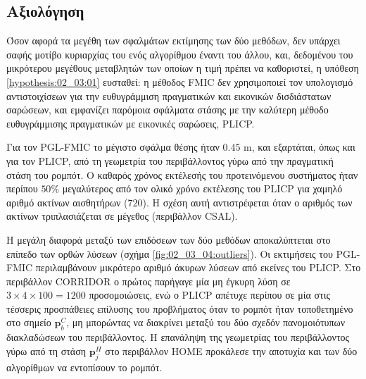 \subsection{Αξιολόγηση}
\label{subsection:02_03_04:03}

Όσον αφορά τα μεγέθη των σφαλμάτων εκτίμησης των δύο μεθόδων, δεν υπάρχει σαφής
μοτίβο κυριαρχίας του ενός αλγορίθμου έναντι του άλλου, και, δεδομένου του
μικρότερου μεγέθους μεταβλητών των οποίων η τιμή πρέπει να καθοριστεί, η
υπόθεση \ref{hypothesis:02_03:01} ευσταθεί: η μέθοδος FMIC δεν χρησιμοποιεί
τον υπολογισμό αντιστοιχίσεων για την ευθυγράμμιση πραγματικών και εικονικών
δισδιάστατων σαρώσεων, και εμφανίζει παρόμοια σφάλματα στάσης με την καλύτερη
μέθοδο ευθυγράμμισης πραγματικών με εικονικές σαρώσεις, PLICP.

Για τον PGL-FMIC το μέγιστο σφάλμα θέσης ήταν $0.45$ m, και εξαρτάται, όπως και
για τον PLICP, από τη γεωμετρία του περιβάλλοντος γύρω από την πραγματική στάση
του ρομπότ.  Ο καθαρός χρόνος εκτέλεσής του προτεινόμενου συστήματος ήταν
περίπου $50\%$ μεγαλύτερος από τον ολικό χρόνο εκτέλεσης του PLICP για χαμηλό
αριθμό ακτίνων αισθητήρων ($720$). H σχέση αυτή αντιστρέφεται όταν ο αριθμός
των ακτίνων τριπλασιάζεται σε μέγεθος (περιβάλλον CSAL).

Η μεγάλη διαφορά μεταξύ των επιδόσεων των δύο μεθόδων αποκαλύπτεται στο επίπεδο
των ορθών λύσεων (σχήμα \ref{fig:02_03_04:outliers}). Οι εκτιμήσεις του
PGL-FMIC περιλαμβάνουν μικρότερο αριθμό άκυρων λύσεων από εκείνες του PLICP.
Στο περιβάλλον CORRIDOR ο πρώτος παρήγαγε μία μη έγκυρη λύση σε
$3\times4\times100 = 1200$  προσομοιώσεις, ενώ ο PLICP απέτυχε περίπου σε μία
στις τέσσερις προσπάθειες επίλυσης του προβλήματος όταν το ρομπότ ήταν
τοποθετημένο στο σημείο $\bm{p}_b^C$, μη μπορώντας να διακρίνει μεταξύ του δύο
σχεδόν πανομοιότυπων διακλαδώσεων του περιβάλλοντος. Η επανάληψη της γεωμετρίας
του περιβάλλοντος γύρω από τη στάση $\bm{p}_j^H$ στο περιβάλλον HOME προκάλεσε
την αποτυχία και των δύο αλγορίθμων να εντοπίσουν το ρομπότ.

